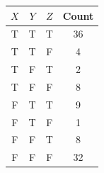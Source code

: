 \documentclass[a4paper]{article}
\theoremstyle{definition}
\begin{document}
\begin{table}[H]
	\centering
	\begin{tabular}{cccc}
		$X$ & $Y$ & $Z$ & Count \\
		\hline
		T   & T   & T   & 36    \\
		\hline
		T   & T   & F   & 4     \\
		\hline
		T   & F   & T   & 2     \\
		\hline
		T   & F   & F   & 8     \\
		\hline
		F   & T   & T   & 9     \\
		\hline
		F   & T   & F   & 1     \\
		\hline
		F   & F   & T   & 8     \\
		\hline
		F   & F   & F   & 32    \\
		\hline
	\end{tabular}
\end{table}
\end{document}
